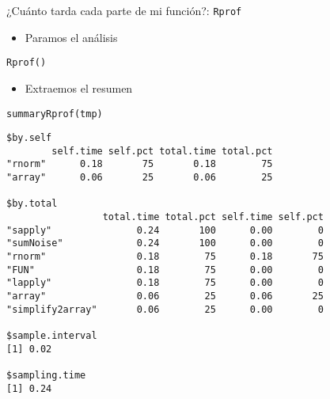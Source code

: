 \documentclass[xcolor={usenames,svgnames,dvipsnames}]{beamer}
\begin{document}
\begin{frame}[fragile,label={sec:orgheadline28}]{¿Cuánto tarda cada parte de mi función?: \texttt{Rprof}}
 \begin{itemize}
\item Paramos el análisis
\end{itemize}
\lstset{language=R,label= ,caption= ,captionpos=b,numbers=none}
\begin{lstlisting}
Rprof()
\end{lstlisting}

\begin{itemize}
\item Extraemos el resumen
\end{itemize}
\lstset{language=R,label= ,caption= ,captionpos=b,numbers=none}
\begin{lstlisting}
summaryRprof(tmp)
\end{lstlisting}

\begin{verbatim}
$by.self
        self.time self.pct total.time total.pct
"rnorm"      0.18       75       0.18        75
"array"      0.06       25       0.06        25

$by.total
                 total.time total.pct self.time self.pct
"sapply"               0.24       100      0.00        0
"sumNoise"             0.24       100      0.00        0
"rnorm"                0.18        75      0.18       75
"FUN"                  0.18        75      0.00        0
"lapply"               0.18        75      0.00        0
"array"                0.06        25      0.06       25
"simplify2array"       0.06        25      0.00        0

$sample.interval
[1] 0.02

$sampling.time
[1] 0.24
\end{verbatim}
\end{frame}
\end{document}
